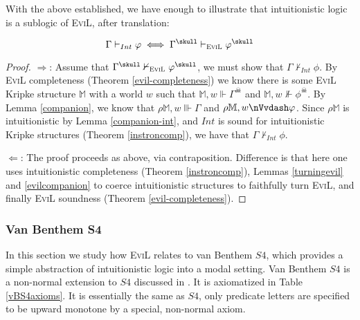 With the above established, we have enough to illustrate that
intuitionistic logic is a sublogic of \textsc{EviL}, after translation:

\begin{theorem}\label{evil_embedding}
\[ \Gamma \vdash_{Int} \phi \iff \Gamma^\skull \vdash_{\textsc{EviL}} \phi^\skull\]
\end{theorem}
\begin{proof}
$\Longrightarrow$: Assume that $\Gamma^\skull \nvdash_{\textsc{EviL}}
  \phi^\skull$, we must show that $\Gamma \nvdash_{Int} \phi$.  By
  \textsc{EviL} completeness (Theorem \ref{evil-completeness}) we know
  there is some \textsc{EviL} Kripke structure $\mathbb{M}$ with a
  world $w$ such that
$\mathbb{M},w\Vdash \Gamma^\skull$ and
$\mathbb{M},w\nVdash \phi^\skull$.  By Lemma \ref{companion}, 
we know that $\rho\mathbb{M},w\Vvdash \Gamma$ and
$\rho\mathbb{M},w\nVvdash \phi$.  Since $\rho\mathbb{M}$ is
intuitionistic by Lemma \ref{companion-int}, and $Int$ is sound for
intuitionistic Kripke structures
(Theorem \ref{instroncomp}), we have that $\Gamma\nvdash_{Int}\phi$.

$\Longleftarrow$:  The proof proceeds as above, via contraposition.
Difference is that here one uses
intuitionistic completeness (Theorem \ref{instroncomp}), Lemmas
\ref{turningevil} and \ref{evilcompanion} to coerce intuitionistic
structures to faithfully turn \textsc{EviL}, and finally \textsc{EviL}
soundness (Theorem \ref{evil-completeness}).
\end{proof}

\subsubsection{Van Benthem S4}

In this section we study how \textsc{EviL} relates to van Benthem
$S4$, which provides a simple abstraction of intuitionistic logic into
a modal setting.  Van Benthem $S4$ is a non-normal extension to $S4$
discussed in \cite{van_benthem_exploring_1996,van_benthem_information_2009,van_benthem_semantic_1989}.
It is axiomatized in Table \ref{vBS4axioms}.  It is essentially the
same as $S4$, only predicate letters are specified to be upward
monotone by a special, non-normal axiom.

